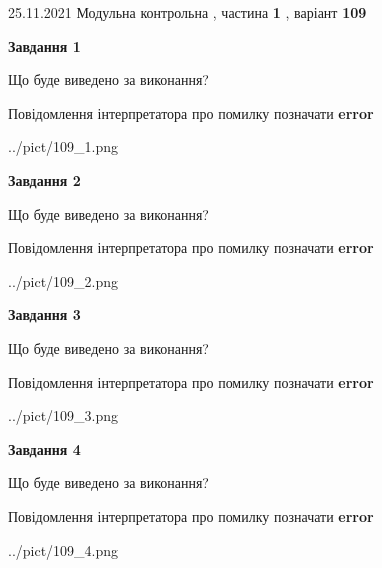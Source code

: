 \documentclass[10pt, ukrainian]{article}
\begin{document}
{25.11.2021 Модульна контрольна , частина \textbf { 1 }, варіант  \No \textbf { 109 }\par}
{
\begin {large}

{\begin {center}\textbf{Завдання 1}\end {center}}\par
Що буде виведено за виконання? \par
Повідомлення інтерпретатора про помилку позначати \textbf{error}

\begin{center}
	{../pict/109_1.png}
\end{center}
\newpage

{\begin {center}\textbf{Завдання 2}\end {center}}\par
Що буде виведено за виконання? \par
Повідомлення інтерпретатора про помилку позначати \textbf{error}

\begin{center}
	{../pict/109_2.png}
\end{center}
\newpage

{\begin {center}\textbf{Завдання 3}\end {center}}\par
Що буде виведено за виконання? \par
Повідомлення інтерпретатора про помилку позначати \textbf{error}

\begin{center}
	{../pict/109_3.png}
\end{center}
\newpage

{\begin {center}\textbf{Завдання 4}\end {center}}\par
Що буде виведено за виконання? \par
Повідомлення інтерпретатора про помилку позначати \textbf{error}

\begin{center}
	{../pict/109_4.png}
\end{center}
\newpage


\end{large}}
\end{document}
